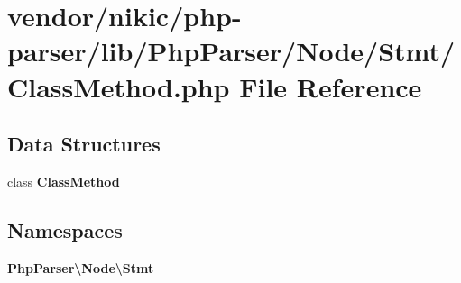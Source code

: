 \section{vendor/nikic/php-\/parser/lib/\+Php\+Parser/\+Node/\+Stmt/\+Class\+Method.php File Reference}
\label{_class_method_8php}
\subsection*{Data Structures}
\begin{DoxyCompactItemize}
\item 
class {\bf Class\+Method}
\end{DoxyCompactItemize}
\subsection*{Namespaces}
\begin{DoxyCompactItemize}
\item 
 {\bf Php\+Parser\textbackslash{}\+Node\textbackslash{}\+Stmt}
\end{DoxyCompactItemize}
